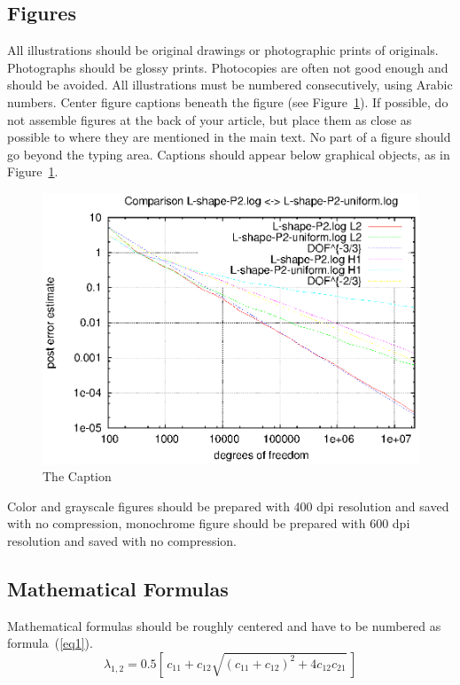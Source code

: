 \documentclass[english]{ccdconf}
\begin{document}
\subsection{Figures}

All illustrations should be original drawings or photographic prints of
originals.  Photographs should be glossy prints. Photocopies are often
not good enough and should be avoided.  All illustrations must be numbered
consecutively, using Arabic numbers.  Center figure captions beneath the
figure (see Figure~\ref{fig1}). If possible, do not assemble figures at the
back of your article, but place them as close as possible to where they are
mentioned in the main text. No part of a figure should go beyond the typing
area. Captions should appear below graphical objects, as in Figure~\ref{fig1}.

\begin{figure}
  \centering
  \includegraphics[width=\hsize]{fig1.eps}
  \caption{The Caption}
  \label{fig1}
\end{figure}

Color and grayscale figures should be prepared with 400 dpi
resolution and  saved with no compression, monochrome figure should
be prepared with 600 dpi resolution and saved with no compression.

\subsection{Mathematical Formulas}

Mathematical formulas should be roughly centered and have to be numbered
as formula~(\ref{eq1}).
\begin{equation}
  \label{eq1}
  \lambda_{1,2} = 0.5 \left[\, c_{11} + c_{12}
            \sqrt{(c_{11} + c_{12})^2 + 4 c_{12} c_{21}} \,\right]
\end{equation}
\end{document}
